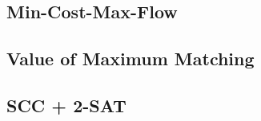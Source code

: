 \subsection{Min-Cost-Max-Flow}


\subsection{Value of Maximum Matching}


%

%


%

\subsection{SCC + 2-SAT}

